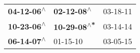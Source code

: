 \begin{supertabular}{lll}
 \textbf{04-12-06\textsuperscript{$\wedge$}} &   \textbf{02-12-08\textsuperscript{$\wedge$}} &  03-18-11\textsuperscript{} \\
 \textbf{10-23-06\textsuperscript{$\wedge$}} &  \textbf{10-29-08\textsuperscript{$\wedge$*}} &  03-14-14\textsuperscript{} \\
 \textbf{06-14-07\textsuperscript{$\wedge$}} &                    01-15-10\textsuperscript{} &  03-05-15\textsuperscript{} \\
\end{supertabular}
